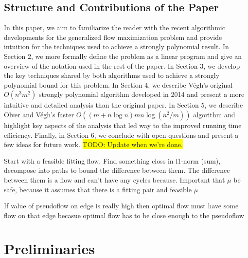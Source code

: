 \documentclass[12pt]{article}
\theoremstyle{definition}
\newcommand{\todo}[1]{\colorbox{yellow}{TODO: #1}}
\begin{document}
	\subsection{Structure and Contributions of the Paper} In this paper, we aim to familiarize the reader with the recent algorithmic developments for the generalized flow maximization problem and provide intuition for the techniques used to achieve a strongly polynomial result. In Section 2, we more formally define the problem as a linear program and give an overview of the notation used in the rest of the paper. In Section 3, we develop the key techniques shared by both algorithms used to achieve a strongly polynomial bound for this problem. In Section 4, we describe Végh's original $O(n^3m^2)$ strongly polynomial algorithm developed in 2014 and present a more intuitive and detailed analysis than the original paper. In Section 5, we describe Olver and Végh's faster $O((m + n\log n)mn\log(n^2 / m))$ algorithm and highlight key aspects of the analysis that led way to the improved running time efficiency. Finally, in Section 6, we conclude with open questions and present a few ideas for future work. \todo{Update when we're done.}
    
Start with a feasible fitting flow. Find something closs in l1-norm (sum), decompose into paths to bound the difference between them. The difference between them is a flow and can't have any cycles because.
Important that $\mu$ be safe, because it assumes that there is a fitting pair and feasible $\mu$

If value of pseudoflow on edge is really high then optimal flow must have some flow on that edge becasue optimal flow has to be close enough to the pseudoflow
    
\section{Preliminaries}
\end{document}
